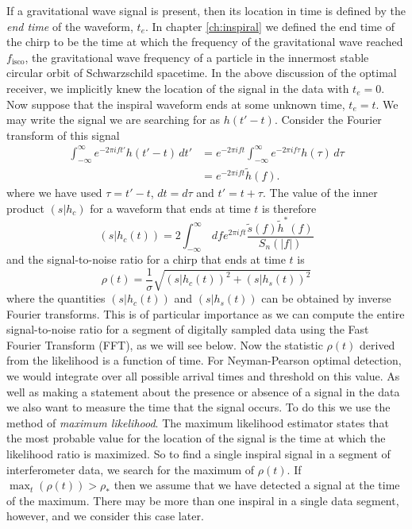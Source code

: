 If a gravitational wave signal is present, then its location in time is
defined by the \emph{end time} of the waveform, $t_e$. In chapter
\ref{ch:inspiral} we defined the end time of the chirp to be the time at which
the frequency of the gravitational wave reached $f_\mathrm{isco}$, the
gravitational wave frequency of a particle in the innermost stable circular
orbit of Schwarzschild spacetime.  In the above discussion of the optimal
receiver, we implicitly knew the location of the signal in the data with
$t_e = 0$. Now suppose that the inspiral waveform ends at some unknown time,
$t_e = t$. We may write the signal we are searching for as $h(t'-t)$. Consider
the Fourier transform of this signal
\begin{equation}
\begin{split}
\int_{-\infty}^\infty e^{-2\pi i f t'} h(t'-t) \, dt' &= 
e^{-2\pi ift} \int_{-\infty}^\infty e^{-2\pi i f \tau} h(\tau) \, d\tau \\
&= e^{-2\pi ift} \tilde{h}(f).
\end{split}
\end{equation}
where we have used $\tau = t' - t$, $dt = d\tau$ and $t' = t + \tau$.
The value of the inner product $(s|h_c)$ for a waveform that ends at time $t$ is
therefore
\begin{equation}
(s|h_c(t)) = 2 \int_{-\infty}^\infty\,df e^{2\pi ift}
\frac{\tilde{s}(f)\tilde{h}^\ast(f)}{S_n(|f|)}
\label{eq:ipift}
\end{equation}
and the signal-to-noise ratio for a chirp that ends at time $t$ is
\begin{equation}
\rho(t) = \frac{1}{\sigma} \sqrt{ (s|h_c(t))^2 + (s|h_s(t))^2}
\end{equation}
where the quantities $(s|h_c(t))$ and $(s|h_s(t))$ can be obtained by inverse
Fourier transforms. This is of particular importance as we can compute the
entire signal-to-noise ratio for a segment of digitally sampled data using the
Fast Fourier Transform (FFT), as we will see below. Now the statistic $\rho(t)$
derived from the likelihood is a function of time. For Neyman-Pearson optimal
detection, we would integrate over all possible arrival times and threshold on
this value. As well as making a statement about the presence or absence of a
signal in the data we also want to measure the time that the signal occurs. To
do this we use the method of \emph{maximum likelihood}\cite{helstrom:1995}.
The maximum likelihood estimator states that the most probable value for the
location of the signal is the time at which the likelihood ratio is maximized.
So to find a single inspiral signal in a segment of interferometer data, we
search for the maximum of $\rho(t)$. If $\max_t(\rho(t)) > \rho_\ast$ then we
assume that we have detected a signal at the time of the maximum. There may be
more than one inspiral in a single data segment, however, and we consider this
case later.

